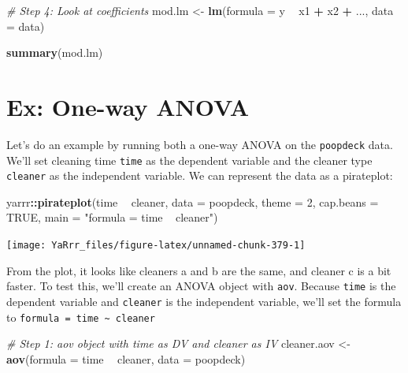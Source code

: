 \documentclass[]{book}
\newenvironment{Shaded}{\begin{snugshade}}{\end{snugshade}}
\newcommand{\KeywordTok}[1]{\textcolor[rgb]{0.13,0.29,0.53}{\textbf{#1}}}
\newcommand{\DataTypeTok}[1]{\textcolor[rgb]{0.13,0.29,0.53}{#1}}
\newcommand{\DecValTok}[1]{\textcolor[rgb]{0.00,0.00,0.81}{#1}}
\newcommand{\StringTok}[1]{\textcolor[rgb]{0.31,0.60,0.02}{#1}}
\newcommand{\CommentTok}[1]{\textcolor[rgb]{0.56,0.35,0.01}{\textit{#1}}}
\newcommand{\OtherTok}[1]{\textcolor[rgb]{0.56,0.35,0.01}{#1}}
\newcommand{\OperatorTok}[1]{\textcolor[rgb]{0.81,0.36,0.00}{\textbf{#1}}}
\newcommand{\NormalTok}[1]{#1}
\theoremstyle{definition}
\theoremstyle{definition}
\theoremstyle{remark}
\begin{document}
\begin{Shaded}
\begin{Highlighting}[]
\CommentTok{# Step 4: Look at coefficients}
\NormalTok{mod.lm <-}\StringTok{ }\KeywordTok{lm}\NormalTok{(}\DataTypeTok{formula =}\NormalTok{ y }\OperatorTok{~}\StringTok{ }\NormalTok{x1 }\OperatorTok{+}\StringTok{ }\NormalTok{x2 }\OperatorTok{+}\StringTok{ }\NormalTok{...,}
             \DataTypeTok{data =}\NormalTok{ data)}

\KeywordTok{summary}\NormalTok{(mod.lm)}
\end{Highlighting}
\end{Shaded}

\section{Ex: One-way ANOVA}\label{ex-one-way-anova}

Let's do an example by running both a one-way ANOVA on the
\texttt{poopdeck} data. We'll set cleaning time \texttt{time} as the
dependent variable and the cleaner type \texttt{cleaner} as the
independent variable. We can represent the data as a pirateplot:

\begin{Shaded}
\begin{Highlighting}[]
\NormalTok{yarrr}\OperatorTok{::}\KeywordTok{pirateplot}\NormalTok{(time }\OperatorTok{~}\StringTok{ }\NormalTok{cleaner, }
                  \DataTypeTok{data =}\NormalTok{ poopdeck, }
                  \DataTypeTok{theme =} \DecValTok{2}\NormalTok{, }
                  \DataTypeTok{cap.beans =} \OtherTok{TRUE}\NormalTok{,}
                  \DataTypeTok{main =} \StringTok{"formula = time ~ cleaner"}\NormalTok{)}
\end{Highlighting}
\end{Shaded}

\begin{center}\texttt{[image: YaRrr\_files/figure-latex/unnamed-chunk-379-1]} \end{center}

From the plot, it looks like cleaners a and b are the same, and cleaner
c is a bit faster. To test this, we'll create an ANOVA object with
\texttt{aov}. Because \texttt{time} is the dependent variable and
\texttt{cleaner} is the independent variable, we'll set the formula to
\texttt{formula\ =\ time\ \textasciitilde{}\ cleaner}

\begin{Shaded}
\begin{Highlighting}[]
\CommentTok{# Step 1: aov object with time as DV and cleaner as IV}
\NormalTok{cleaner.aov <-}\StringTok{ }\KeywordTok{aov}\NormalTok{(}\DataTypeTok{formula =}\NormalTok{ time }\OperatorTok{~}\StringTok{ }\NormalTok{cleaner,}
                   \DataTypeTok{data =}\NormalTok{ poopdeck)}
\end{Highlighting}
\end{Shaded}
\end{document}

